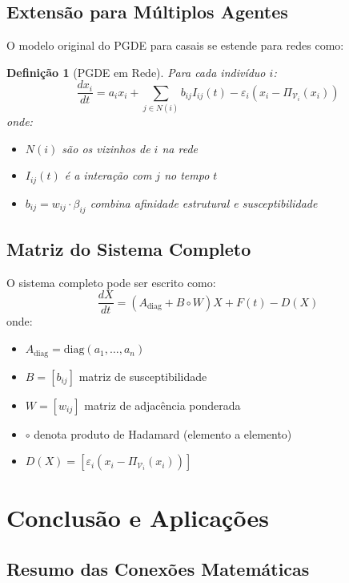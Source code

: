 \documentclass[12pt, a4paper]{article}
\newtheorem{definition}{Definição}
\begin{document}
\subsection{Extensão para Múltiplos Agentes}

O modelo original do PGDE para casais se estende para redes como:

\begin{definition}[PGDE em Rede]
Para cada indivíduo $i$:
\[
\frac{dx_i}{dt} = a_i x_i + \sum_{j \in N(i)} b_{ij} I_{ij}(t) - \varepsilon_i(x_i - \Pi_{\mathcal{V}_i}(x_i))
\]
onde:
\begin{itemize}
\item $N(i)$ são os vizinhos de $i$ na rede
\item $I_{ij}(t)$ é a interação com $j$ no tempo $t$
\item $b_{ij} = w_{ij} \cdot \beta_{ij}$ combina afinidade estrutural e susceptibilidade
\end{itemize}
\end{definition}

\subsection{Matriz do Sistema Completo}

O sistema completo pode ser escrito como:
\[
\frac{dX}{dt} = (A_{\text{diag}} + B \circ W) X + F(t) - D(X)
\]
onde:
\begin{itemize}
\item $A_{\text{diag}} = \text{diag}(a_1, \dots, a_n)$
\item $B = [b_{ij}]$ matriz de susceptibilidade
\item $W = [w_{ij}]$ matriz de adjacência ponderada
\item $\circ$ denota produto de Hadamard (elemento a elemento)
\item $D(X) = [\varepsilon_i(x_i - \Pi_{\mathcal{V}_i}(x_i))]$
\end{itemize}

\section{Conclusão e Aplicações}

\subsection{Resumo das Conexões Matemáticas}
\end{document}
